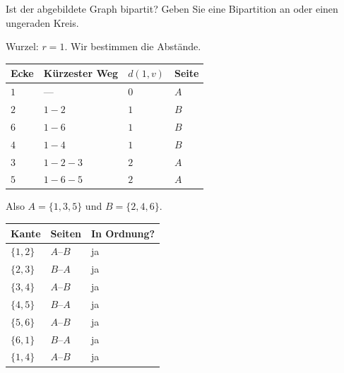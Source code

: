 \begin{aufgabe}
Ist der abgebildete Graph bipartit? Geben Sie eine Bipartition an oder einen ungeraden Kreis.

\begin{center}
\end{center}

\loesung
{}
Wurzel: $r = 1$. Wir bestimmen die Abstände.

\begin{center}
\renewcommand{\arraystretch}{1.42}
\begin{tabular}{@{}P{1.4cm}P{3.4cm}P{1.4cm}P{1.4cm}@{}}
\toprule
\textbf{Ecke} & \textbf{Kürzester Weg} & $d(1,v)$ & \textbf{Seite}\\
\midrule
$1$ & --- & $0$ & $A$\\
$2$ & $1\!-\!2$ & $1$ & $B$\\
$6$ & $1\!-\!6$ & $1$ & $B$\\
$4$ & $1\!-\!4$ & $1$ & $B$\\
$3$ & $1\!-\!2\!-\!3$ & $2$ & $A$\\
$5$ & $1\!-\!6\!-\!5$ & $2$ & $A$\\
\bottomrule
\end{tabular}
\end{center}

Also $A = \{1, 3, 5\}$ und $B = \{2, 4, 6\}$.

\begin{center}
\renewcommand{\arraystretch}{1.4}
\begin{tabular}{@{}P{1.6cm}P{2.6cm}P{2.4cm}@{}}
\toprule
\textbf{Kante} & \textbf{Seiten} & \textbf{In Ordnung?}\\
\midrule
$\{1,2\}$ & $A$--$B$ & ja\\
$\{2,3\}$ & $B$--$A$ & ja\\
$\{3,4\}$ & $A$--$B$ & ja\\
$\{4,5\}$ & $B$--$A$ & ja\\
$\{5,6\}$ & $A$--$B$ & ja\\
$\{6,1\}$ & $B$--$A$ & ja\\
$\{1,4\}$ & $A$--$B$ & ja\\
\bottomrule
\end{tabular}
\end{center}


\end{aufgabe}
